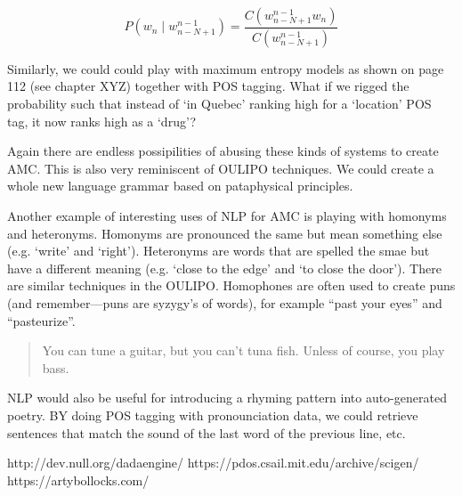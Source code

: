 \begin{equation}
  P(w_n \mid w_{n-N+1}^{n-1}) = \frac{C(w_{n-N+1}^{n-1} w_n)}{C(w_{n-N+1}^{n-1})}
  \label{eq:probmoe}
\end{equation}

Similarly, we could could play with maximum entropy models as shown on page \num{112} (see chapter XYZ) together with \ac{POS} tagging. What if we rigged the probability such that instead of `in Quebec' ranking high for a `location' \ac{POS} tag, it now ranks high as a `drug'?

Again there are endless possipilities of abusing these kinds of systems to create \ac{AMC}. This is also very reminiscent of \ac{OULIPO} techniques. We could create a whole new language grammar based on pataphysical principles.

Another example of interesting uses of \ac{NLP} for \ac{AMC} is playing with homonyms and heteronyms. Homonyms are pronounced the same but mean something else (e.g. `write' and `right'). Heteronyms are words that are spelled the smae but have a different meaning (e.g. `close to the edge' and `to close the door'). There are similar techniques in the \ac{OULIPO}. Homophones are often used to create puns (and remember---puns are syzygy's of words), for example ``past your eyes'' and ``pasteurize''. 

\begin{quotation}
   You can tune a guitar, but you can't tuna fish. Unless of course, you play bass. 
\end{quotation}

\ac{NLP} would also be useful for introducing a rhyming pattern into auto-generated poetry. BY doing \ac{POS} tagging with pronounciation data, we could retrieve sentences that match the sound of the last word of the previous line, etc.


http://dev.null.org/dadaengine/
https://pdos.csail.mit.edu/archive/scigen/
https://artybollocks.com/

